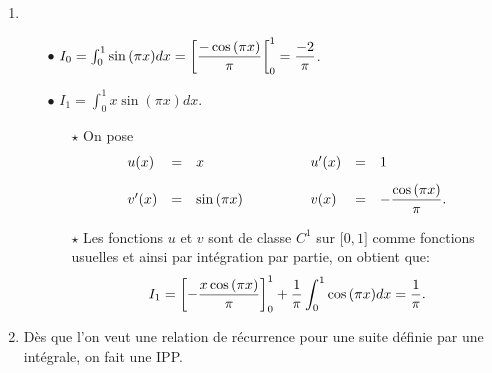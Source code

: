 \documentclass[a4paper, 11pt,reqno]{article}
\begin{document}
\begin{correction}
\begin{enumerate}
\begin{itemize}
			      \item[$\bullet$] On a ainsi:
			            \begin{itemize}
				            \item[$\star$] Pour tout $n\in\N$, $-\ddp\frac{1}{n+1}\leq I_n \leq \ddp\frac{1}{n+1}$.
				            \item[$\star$] $\lim\limits_{n\to +\infty} -\ddp\frac{1}{n+1}=\lim\limits_{n\to +\infty} \ddp\frac{1}{n+1}=0$ par propri\'et\'e sur les quotients de limites.
			            \end{itemize}
			            Ainsi d'apr\`{e}s le th\'eor\`{e}me des gendarmes, on obtient que la suite converge et que: $\lim\limits_{n\to +\infty} I_n=0$.
		      \end{itemize}
		\item
		      \begin{itemize}
			      \item[$\bullet$] $I_0=\int_0^1 \sin{(\pi x)} dx=\left\lbrack \displaystyle\frac{-\cos{(\pi x)}}{\pi}\right\lbrack_0^1=\displaystyle\frac{-2}{\pi}$.
			      \item[$\bullet$] $I_1=\int_0^1 x\sin{(\pi x)} dx$.
			            \begin{itemize}
				            \item[$\star$] On pose
				                  $$\begin{array}{lllllll}
						                  u(x)          & = & x             & \hspace{1cm} & u^{\prime}(x) & = & 1\vsec                          \\
						                  v^{\prime}(x) & = & \sin{(\pi x)} & \hspace{1cm} & v(x)          & = & -\ddp\frac{\cos{(\pi x)}}{\pi}.
					                  \end{array}$$
				            \item[$\star$] Les fonctions $u$ et $v$ sont de classe $C^1$ sur $\lbrack 0,1\rbrack$ comme fonctions usuelles et ainsi par int\'egration par partie, on obtient que:
				                  $$I_1=\left\lbrack -\displaystyle\frac{x\cos{(\pi x)}}{\pi} \right\rbrack_0^1+\displaystyle\frac{1}{\pi}\int_0^1 \cos{(\pi x)} dx=\displaystyle\frac{1}{\pi}.$$
			            \end{itemize}
		      \end{itemize}
		\item
		      D\`{e}s que l'on veut une relation de r\'ecurrence pour une suite d\'efinie par une int\'egrale, on fait une IPP.
		      \begin{itemize}

\end{itemize}
\end{enumerate}
\end{correction}
\end{document}
